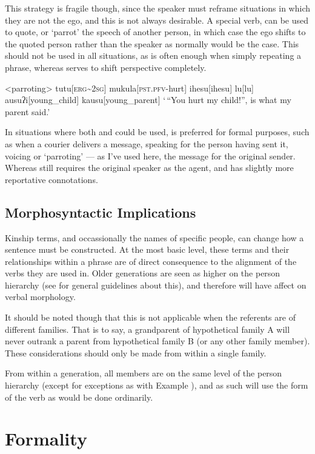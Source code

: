 \documentclass[openany, 12pt, b5paper, draft]{memoir}
\begin{document}
This strategy is fragile though, since the speaker must reframe situations in which they are not the ego, and this is not always desirable. A special verb,  can be used to quote, or `parrot' the speech of another person, in which case the ego shifts to the quoted person rather than the speaker as normally would be the case. This should not be used in all situations, as  is often enough when simply repeating a phrase, whereas  serves to shift perspective completely.

\ex<parroting>
\begingl
tutu[\textsc{erg\textasciitilde 2sg}]
mukula[\textsc{pst.pfv-}hurt]
ihesu[ihesu]
lu[lu]
ausuʔi[young\_child]
kausu[young\_parent]
\glft `\,``You hurt my child!'', is what my parent said.'
\endgl
\xe

In situations where both  and  could be used,  is preferred for formal purposes, such as when a courier delivers a message, speaking for the person having sent it, voicing or `parroting' --- as I've used here, the message for the original sender. Whereas  still requires the original speaker as the agent, and has slightly more reportative connotations.

\subsection{Morphosyntactic Implications}
Kinship terms, and occassionally the names of specific people, can change how a sentence must be constructed. At the most basic level, these terms and their relationships within a phrase are of direct consequence to the alignment of the verbs they are used in. Older generations are seen as higher on the person hierarchy (see  for general guidelines about this), and therefore will have affect on verbal morphology.

It should be noted though that this is not applicable when the referents are of different families. That is to say, a grandparent of hypothetical family A will never outrank a parent from hypothetical family B (or any other family member). These considerations should only be made from within a single family.

From within a generation, all members are on the same level of the person hierarchy (except for exceptions as with Example ), and as such will use the form of the verb as would be done ordinarily.


\section{Formality}
\end{document}

